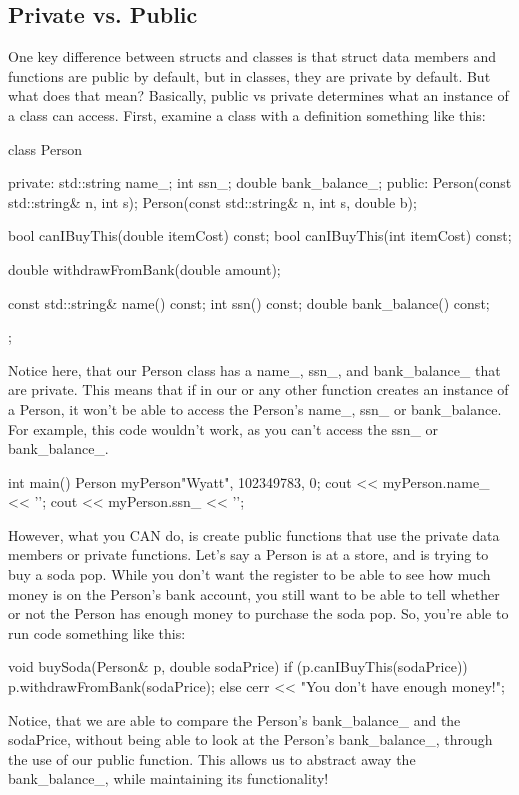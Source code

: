 \documentclass{tufte-handout}
\begin{document}
\subsection{Private vs. Public}
One key difference between structs and classes is that struct data members and functions are public by default, but in classes, they are private by default.
But what does that mean?
Basically, public vs private determines what an instance of a class can access.
First, examine a class with a definition something like this:
\begin{Code}
class Person
{
private:
    std::string name_;
    int ssn_;
    double bank_balance_;
public:
    Person(const std::string& n, int s);
    Person(const std::string& n, int s, double b);

    bool canIBuyThis(double itemCost) const;
    bool canIBuyThis(int itemCost) const;

    double withdrawFromBank(double amount);

    const std::string& name() const;
    int ssn() const;
    double bank_balance() const;
};
\end{Code}
Notice here, that our Person class has a name\_, ssn\_, and bank\_balance\_ that are private. 
This means that if in our  or any other function creates an instance of a Person, it won't be able to access the Person's name\_, ssn\_ or bank\_balance.
For example, this code wouldn't work, as you can't access the ssn\_ or bank\_balance\_.
\begin{Code}
int main()
{
    Person myPerson{"Wyatt", 102349783, 0};
    cout << myPerson.name_ << '\n';
    cout << myPerson.ssn_ << '\n';
}
\end{Code}
However, what you CAN do, is create public functions that use the private data members or private functions.
Let's say a Person is at a store, and is trying to buy a soda pop.
While you don't want the register to be able to see how much money is on the Person's bank account, you still want to be able to tell whether or not the Person has enough money to purchase the soda pop.
So, you're able to run code something like this:
\begin{Code}
void buySoda(Person& p, double sodaPrice)
{
    if (p.canIBuyThis(sodaPrice)) {
        p.withdrawFromBank(sodaPrice);
    } else {
        cerr << "You don't have enough money!\n";
    }
}
\end{Code}
Notice, that we are able to compare the Person's bank\_balance\_ and the sodaPrice, without being able to look at the Person's bank\_balance\_, through the use of our public  function.
This allows us to abstract away the bank\_balance\_, while maintaining its functionality!
\end{document}
